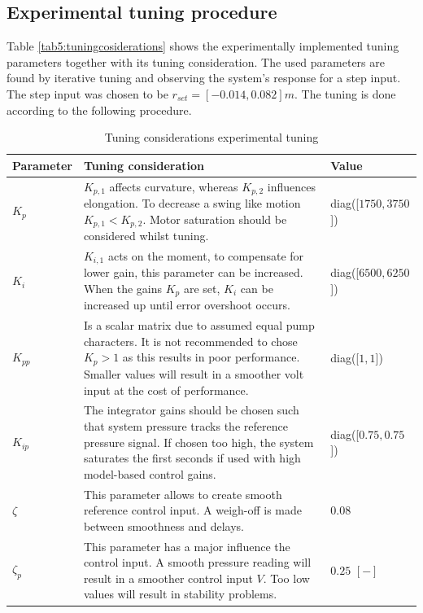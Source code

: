 \subsection*{Experimental tuning procedure}


Table \ref{tab5:tuningcosiderations} shows the experimentally implemented tuning parameters together with its tuning consideration. The used parameters are found by iterative tuning and observing the system's response for a step input. The step input was chosen to be $r_{set} = [-0.014,0.082]m$. The tuning is done according to the following procedure.


\begin{table}[H]
    \centering
     \caption{Tuning considerations experimental tuning}
    \begin{tabular}{p{2.5cm} p{9cm} p{3cm}} \hline
      \textbf{Parameter}   & \textbf{Tuning  consideration} & \textbf{Value } \\ \hline
      $K_p$   &   $K_{p,1}$ affects curvature, whereas $K_{p,2}$ influences elongation. To decrease a swing like motion $K_{p,1} < K_{p,2}$. Motor saturation should be considered whilst tuning.   &  diag([$1750,3750$])            \\ \hline
      $K_i$   &   $K_{i,1}$ acts on the moment, to compensate for lower gain, this parameter can be increased. When the gains $K_p$ are set, $K_i$ can be increased up until error overshoot occurs.   &  diag([$6500,6250$])    \\ \hline
      $K_{pp}$   &  Is a scalar matrix due to assumed equal pump characters. It is not recommended to chose $K_p >1$ as this results in poor performance. Smaller values will result in a smoother volt input at the cost of performance.  &  diag([$1 ,1$])     \\ \hline
      $K_{ip}$   &  The integrator gains should be chosen such that system pressure tracks the reference pressure signal. If chosen too high, the system saturates the first seconds if used with high model-based control gains.    &  diag([$0.75,0.75$])    \\ \hline
      $\zeta$    &   This parameter allows to create smooth reference control input. A weigh-off is made between smoothness and delays. &  $0.08$  \\ \hline
      $\zeta_p$    &   This parameter has a major influence the control input. A smooth pressure reading will result in a smoother control input $V$. Too low values will result in stability problems.   & $0.25$ $[-]$  \\ \hline

\end{tabular}
\end{table}
